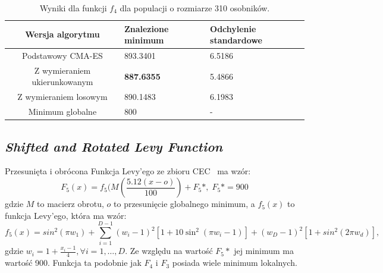 \documentclass[10pt]{article}
\begin{document}
\begin{table}[H]
\centering
\begin{tabularx}{0.9\textwidth}{c|X|X}
Wersja algorytmu & Znalezione minimum & Odchylenie standardowe\\
\hline
Podstawowy CMA-ES & 893.3401 & 6.5186 \\
\hline
Z wymieraniem ukierunkowanym & \textbf{887.6355} & 5.4866 \\
\hline
Z wymieraniem losowym &  890.1483 & 6.1983\\
\hline 
\hline
Minimum globalne & 800 & -
\end{tabularx}
\caption{Wyniki dla funkcji $f_4$ dla populacji o rozmiarze 310 osobników.}
\label{tab:test-Rastrigin}
\end{table}

\subsection{ \textit{Shifted and Rotated Levy Function}}
Przesunięta i obrócona Funkcja Levy'ego ze zbioru CEC~\cite{CEC} ma wzór:
$$F_5(x) = f_5(M(\frac{5.12(x-o)}{100}) + F_5*, \; F_5* = 900$$
gdzie $M$ to macierz obrotu, $o$ to przesunięcie globalnego minimum, a $f_5(x)$ to funkcja Levy'ego, która ma wzór:
$$f_5(x) = sin^2(\pi w_1)  + \sum_{i=1}^{D-1}(w_i-1)^2[1+10\sin^2(\pi w_i -1)] + (w_D - 1)^2 [1+sin^2(2\pi w_d)],$$ gdzie $w_i = 1 + \frac{x_i - 1}{4}, \forall i = 1, \dots , D$. Ze względu na wartość $F_5*$ jej minimum ma wartość 900. Funkcja ta podobnie jak $F_4$ i $F_3$ posiada wiele minimum lokalnych.
\end{document}
